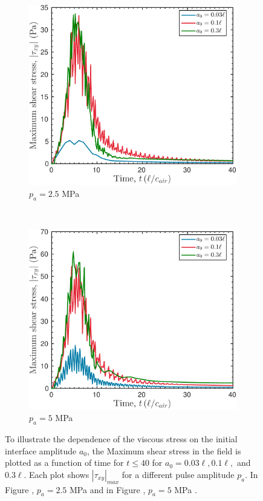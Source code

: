 \begin{figure}
  \centering
  \begin{subfigure}[b]{0.49\textwidth}
    \includegraphics[width=\textwidth]{./figs/lung_figs/rmawave_1_A25_a3,10,30_tauxy_27-Feb-2017}
    \caption{\label{fig:stress_multi-a0-A25} $p_a = 2.5$ MPa}
  \end{subfigure}
  ~ 
  \begin{subfigure}[b]{0.49\textwidth}
    \includegraphics[width=\textwidth]{./figs/lung_figs/rmawave_1_A50_a3,10,30_tauxy_27-Feb-2017}
    \caption{\label{fig:stress_multi-a0-A50} $p_a = 5$ MPa}
  \end{subfigure}
  \caption{To illustrate the dependence of the viscous stress on the
    initial interface amplitude $a_0$, the Maximum shear stress in the
    field is plotted as a function of time for $t\leq40$ for
    $a_0=0.03\ell, 0.1\ell,$ and $0.3\ell$. Each plot shows
    $\left|\tau_{xy}\right|_{max}$ for a different pulse amplitude $p_a$. In
    Figure , $p_a = 2.5$ MPa and in
    Figure , $p_a = 5$ MPa .}
  \label{fig:a0_dependence_stress}
\end{figure}
%
%
%
%

